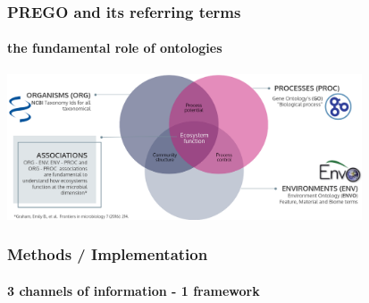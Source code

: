 \documentclass{beamer}
\begin{document}
   \begin{frame}
      \frametitle{PREGO and its referring terms}
      \framesubtitle{the fundamental role of ontologies}
      \includegraphics[width=105mm]{resources/prego_triple_associations.png}
   \end{frame}

   \begin{frame}
      \frametitle{Methods / Implementation}
      \framesubtitle{3 channels of information - 1 framework}

      \begin{singlespace}
      \end{singlespace}
   \end{frame}
\end{document}
